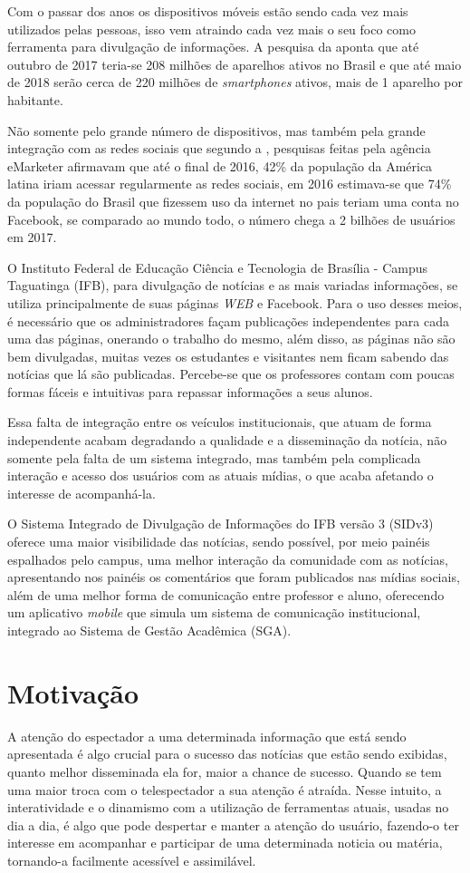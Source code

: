 Com o passar dos anos os dispositivos móveis estão sendo cada vez mais utilizados pelas pessoas, isso vem atraindo cada vez mais o seu foco como ferramenta para divulgação de informações. A pesquisa da \cite{fgv2017} aponta que até outubro de 2017 teria-se 208 milhões de aparelhos ativos no Brasil e que até maio de 2018 serão cerca de 220 milhões de \textit{smartphones} ativos, mais de 1 aparelho por habitante. 

Não somente pelo grande número de dispositivos, mas também pela grande integração com as redes sociais que segundo a \cite{forbes2016}, pesquisas feitas pela agência eMarketer afirmavam que até o final de 2016, 42\% da população da América latina iriam acessar regularmente as redes sociais, em 2016 estimava-se que 74\% da população do Brasil que fizessem uso da internet no pais teriam uma conta no Facebook, se comparado ao mundo todo, o número chega a 2 bilhões de usuários em 2017. 

O Instituto Federal de Educação Ciência e Tecnologia de Brasília - Campus Taguatinga (IFB), para divulgação de notícias e as mais variadas informações, se utiliza principalmente de suas páginas \textit{WEB} e Facebook. Para o uso desses meios, é necessário que os administradores façam publicações independentes para cada uma das páginas, onerando o trabalho do mesmo, além disso, as páginas não são bem divulgadas, muitas vezes os estudantes e visitantes nem ficam sabendo das notícias que lá são publicadas. Percebe-se que os professores contam com poucas formas fáceis e intuitivas para repassar informações a seus alunos.

Essa falta de integração entre os veículos institucionais, que atuam de forma independente acabam degradando a qualidade e a disseminação da notícia, não somente pela falta de um sistema integrado, mas também pela complicada interação e acesso dos usuários com as atuais mídias, o que acaba afetando o interesse de acompanhá-la.

O Sistema Integrado de Divulgação de Informações do IFB versão 3 (SIDv3) oferece uma maior visibilidade das notícias, sendo possível, por meio painéis espalhados pelo campus, uma melhor interação da comunidade com as notícias, apresentando nos painéis os comentários que foram publicados nas mídias sociais, além de uma melhor forma de comunicação entre professor e aluno, oferecendo um aplicativo \textit{mobile} que simula um sistema de comunicação institucional, integrado ao Sistema de Gestão Acadêmica (SGA).

\section{Motivação}
A atenção do espectador a uma determinada informação que está sendo apresentada é algo crucial para o sucesso das notícias que estão sendo exibidas, quanto melhor disseminada ela for, maior a chance de sucesso. Quando se tem uma maior troca com o telespectador a sua atenção é atraída. Nesse intuito, a interatividade e o dinamismo com a utilização de ferramentas atuais, usadas no dia a dia, é algo que pode despertar e manter a atenção do usuário, fazendo-o ter interesse em acompanhar e participar de uma determinada noticia ou matéria, tornando-a facilmente acessível e assimilável. 

